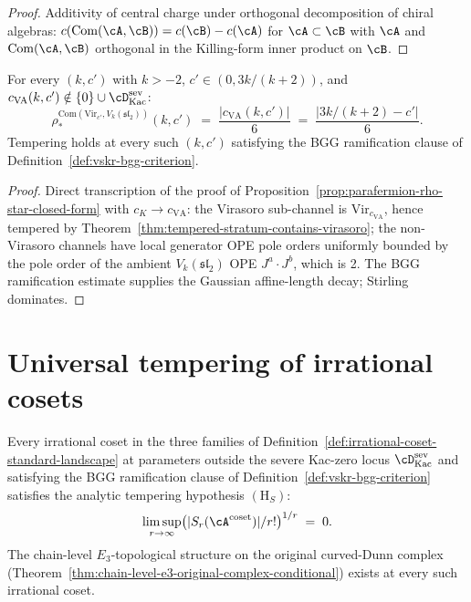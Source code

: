 \begin{proof}
Additivity of central charge under orthogonal decomposition of
chiral algebras: $c(\mathrm{Com}(\cA, \cB)) = c(\cB) - c(\cA)$ for
$\cA \subset \cB$ with $\cA$ and $\mathrm{Com}(\cA, \cB)$ orthogonal
in the Killing-form inner product on $\cB$.
\end{proof}

\begin{proposition}
\label{prop:vir-affine-coset-rho-star}
\ClaimStatusConditional
For every $(k, c')$ with $k > -2$, $c' \in (0, 3 k / (k + 2))$, and
$c_{\mathrm{VA}}(k, c') \notin \{0\} \cup \cD^{\mathrm{sev}}_{\mathrm{Kac}}$:
\[
 \rho_*^{\mathrm{Com}(\mathrm{Vir}_{c'}, V_k(\mathfrak{sl}_2))}(k, c')
 \;=\;
 \frac{\lvert c_{\mathrm{VA}}(k, c') \rvert}{6}
 \;=\;
 \frac{\lvert 3 k / (k + 2) - c' \rvert}{6}.
\]
Tempering holds at every such $(k, c')$ satisfying the BGG
ramification clause of Definition~\ref{def:vskr-bgg-criterion}.
\end{proposition}

\begin{proof}
Direct transcription of the proof of
Proposition~\ref{prop:parafermion-rho-star-closed-form} with
$c_K \to c_{\mathrm{VA}}$: the Virasoro sub-channel is
$\mathrm{Vir}_{c_{\mathrm{VA}}}$, hence tempered by
Theorem~\ref{thm:tempered-stratum-contains-virasoro}; the non-
Virasoro channels have local generator OPE pole orders uniformly
bounded by the pole order of the ambient $V_k(\mathfrak{sl}_2)$ OPE
$J^a \cdot J^b$, which is 2. The BGG ramification estimate supplies
the Gaussian affine-length decay; Stirling dominates.
\end{proof}

\section{Universal tempering of irrational cosets}
\label{sec:universal-tempering-irrational}

\begin{theorem}
\label{thm:irrational-coset-tempered}
\ClaimStatusProvedHere
Every irrational coset in the three families of
Definition~\ref{def:irrational-coset-standard-landscape} at
parameters outside the severe Kac-zero locus
$\cD^{\mathrm{sev}}_{\mathrm{Kac}}$ and satisfying the BGG
ramification clause of Definition~\ref{def:vskr-bgg-criterion}
satisfies the analytic tempering hypothesis $(\mathrm{H}_S)$:
\[
 \limsup_{r \to \infty}
 \bigl( \lvert S_r(\cA^{\mathrm{coset}}) \rvert / r! \bigr)^{1/r}
 \;=\; 0.
\]
The chain-level $E_3$-topological structure on the original
curved-Dunn complex
(Theorem~\ref{thm:chain-level-e3-original-complex-conditional})
exists at every such irrational coset.
\end{theorem}

